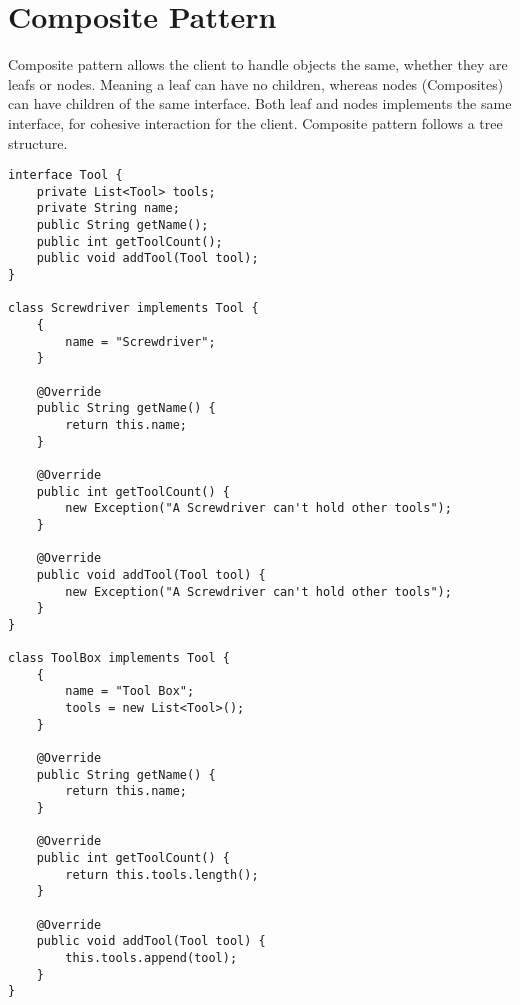 \section{Composite Pattern}
Composite pattern allows the client to handle objects the same, whether they are leafs or nodes. Meaning a leaf can have no children, whereas nodes (Composites) can have children of the same interface. Both leaf and nodes implements the same interface, for cohesive interaction for the client. Composite pattern follows a tree structure.

\begin{lstlisting}
interface Tool {
    private List<Tool> tools;
    private String name;
    public String getName();
    public int getToolCount();
    public void addTool(Tool tool);
}

class Screwdriver implements Tool {
    {
        name = "Screwdriver";
    }

    @Override 
    public String getName() {
        return this.name;
    }

    @Override
    public int getToolCount() {
        new Exception("A Screwdriver can't hold other tools");
    }

    @Override
    public void addTool(Tool tool) {
        new Exception("A Screwdriver can't hold other tools");
    }
}

class ToolBox implements Tool {
    {
        name = "Tool Box";
        tools = new List<Tool>();
    }

    @Override 
    public String getName() {
        return this.name;
    }

    @Override
    public int getToolCount() {
        return this.tools.length();
    }

    @Override
    public void addTool(Tool tool) {
        this.tools.append(tool);
    }
}

\end{lstlisting}